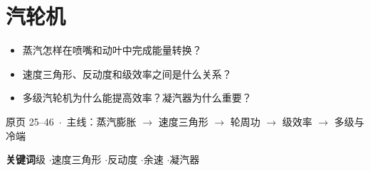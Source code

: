 \section{汽轮机}

\begin{frame}[t,shrink]{}
{\begin{itemize}
  \item 蒸汽怎样在喷嘴和动叶中完成能量转换？
  \item 速度三角形、反动度和级效率之间是什么关系？
  \item 多级汽轮机为什么能提高效率？凝汽器为什么重要？
\end{itemize}}
{原页 25--46 \,$\cdot$\, 主线：蒸汽膨胀 $\rightarrow$ 速度三角形 $\rightarrow$ 轮周功 $\rightarrow$ 级效率 $\rightarrow$ 多级与冷端}
\vspace{3mm}
\begin{center}
\small
\textbf{关键词}\quad 级 \enspace$\cdot$\enspace 速度三角形 \enspace$\cdot$\enspace 反动度 \enspace$\cdot$\enspace 余速 \enspace$\cdot$\enspace 凝汽器
\end{center}
\end{frame}

